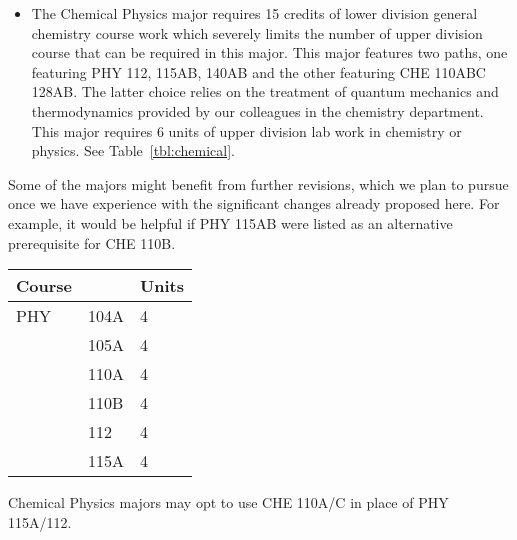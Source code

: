 \documentclass[12pt]{article}
\begin{document}
\begin{itemize}
\item The Chemical Physics major requires 15 credits of lower division
  general chemistry course work which severely limits the number of
  upper division course that can be required in this major.  This
  major features two paths, one featuring PHY 112, 115AB, 140AB and
  the other featuring CHE 110ABC 128AB.  The latter choice relies on
  the treatment of quantum mechanics and thermodynamics provided by
  our colleagues in the chemistry department.  This major requires 6
  units of upper division lab work in chemistry or physics.  See
  Table~\ref{tbl:chemical}.

\end{itemize}
Some of the majors might benefit from further revisions, which we plan
to pursue once we have experience with the significant changes already
proposed here.  For example, it would be helpful if PHY 115AB were
listed as an alternative prerequisite for CHE 110B.

\noindent
\vskip 0.25cm
\begin{center}
\begin{tabular}{|lll|}
\hline
Course & & Units \\
\hline
PHY & 104A   & 4 \\  
    & 105A   & 4 \\ 
    & 110A   & 4 \\ 
    & 110B   & 4 \\
    & 112    & 4 \\
    & 115A   & 4 \\ 
\hline
\end{tabular}
\end{center}
Chemical Physics majors may opt to use CHE 110A/C in place of PHY 115A/112.
\end{document}
